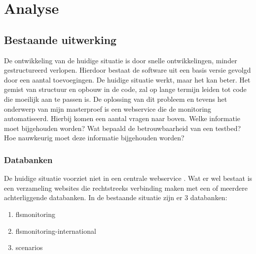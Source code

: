 \newpage
\chapter{Analyse}

\section{Bestaande uitwerking}
\npar
De ontwikkeling van de huidige situatie is door snelle ontwikkelingen, minder gestructureerd verlopen.
Hierdoor bestaat de software uit een basis versie gevolgd door een aantal  toevoegingen. De huidige situatie werkt, maar het kan beter. Het gemist van structuur en opbouw in de code, zal op lange termijn leiden tot code die moeilijk aan te passen is.
\npar
De oplossing van dit probleem en tevens het onderwerp van mijn masterproef is een webservice die de monitoring automatiseerd. Hierbij komen een aantal vragen naar boven. Welke informatie moet bijgehouden worden? 
Wat bepaald de betrouwbaarheid van een testbed? Hoe nauwkeurig moet deze informatie bijgehouden worden? 

\subsection{Databanken}
\npar
De huidige situatie voorziet niet in een centrale webservice \citep{FED4FIRE-doc}.
Wat er wel bestaat is een verzameling websites die rechtstreeks verbinding maken met een of meerdere achterliggende databanken. In de bestaande situatie zijn er 3 databanken:
\begin{enumerate}
\item flsmonitoring
\item flsmonitoring-international
\item scenarios
\end{enumerate}
\newpage
